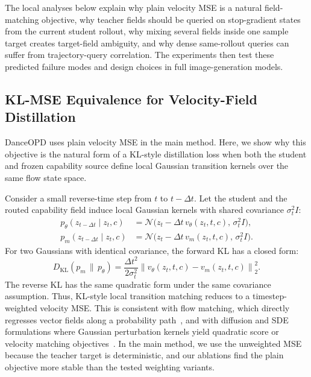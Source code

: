 \documentclass{llmxive}
\begin{document}
The local analyses below explain why plain velocity MSE is a natural field-matching objective, why teacher fields should be queried on stop-gradient states from the current student rollout, why mixing several fields inside one sample target creates target-field ambiguity, and why dense same-rollout queries can suffer from trajectory-query correlation. The experiments then test these predicted failure modes and design choices in full image-generation models.


\vspace{0.2cm}


\subsection{KL-MSE Equivalence for Velocity-Field Distillation}
\label{app:kl-mse}

DanceOPD uses plain velocity MSE in the main method. Here, we show why this objective is the natural form of a KL-style distillation loss when both the student and frozen capability source define local Gaussian transition kernels over the same flow state space.

Consider a small reverse-time step from $t$ to $t-\Delta t$. Let the student and the routed capability field induce local Gaussian kernels with shared covariance $\sigma_t^2 I$:
\begin{align}
  p_\theta(z_{t-\Delta t}\mid z_t,c)
  &= \mathcal{N}\bigl(z_t - \Delta t\,v_\theta(z_t,t,c),\,\sigma_t^2 I\bigr),\\
  p_m(z_{t-\Delta t}\mid z_t,c)
  &= \mathcal{N}\bigl(z_t - \Delta t\,v_m(z_t,t,c),\,\sigma_t^2 I\bigr).
\end{align}
For two Gaussians with identical covariance, the forward KL has a closed form:
\begin{equation}
  D_{\mathrm{KL}}(p_m\,\|\,p_\theta)
  =
  \frac{\Delta t^2}{2\sigma_t^2}
  \left\|v_\theta(z_t,t,c)-v_m(z_t,t,c)\right\|_2^2.
  \label{eq:app-kl-mse}
\end{equation}
The reverse KL has the same quadratic form under the same covariance assumption. Thus, KL-style local transition matching reduces to a timestep-weighted velocity MSE. This is consistent with flow matching, which directly regresses vector fields along a probability path~\cite{lipman2022flow}, and with diffusion and SDE formulations where Gaussian perturbation kernels yield quadratic score or velocity matching objectives~\cite{sohl2015deep,song2019generative,ho2020denoising,nichol2021improved,song2020denoising,dhariwal2021diffusion,song2020score}. In the main method, we use the unweighted MSE because the teacher target is deterministic, and our ablations find the plain objective more stable than the tested weighting variants.
\end{document}
